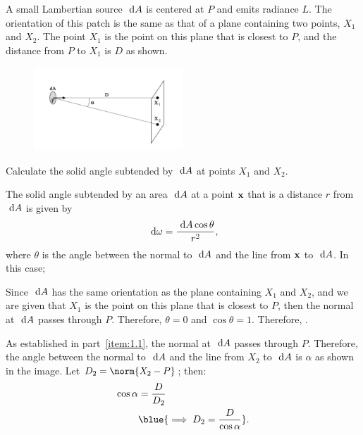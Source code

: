 \begin{problem}
  A small Lambertian source $\text{ d} A$ is centered at $P$
  and emits radiance $L$. The orientation of this patch is the same
  as that of a plane containing two points, $X_1$ and $X_2$.
  The point $X_1$ is the point on this plane that is closest to $P$,
  and the distance from $P$ to $X_1$ is $D$ as shown.
  \begin{figure}[H]
    \centering
    \includegraphics[width=0.5\textwidth]{figures/lambertian.png}
    \label{fig:1}
  \end{figure}
  \begin{enumroman}
    \newpage
    \item Calculate the solid angle subtended by $\text{ d} A$ at points $X_1$ and $X_2$.
      \begin{answer}
        The solid angle subtended by an area $\text{ d} A$ at a point $\mathbf{x}$ that is a distance
        $r$ from $\text{ d} A$ is given by
        \[ \text{ d}\omega = \frac{\text{ d} A \cos\theta}{r^2}, \]
        where $\theta$ is the angle between the normal to $\text{ d} A$
        and the line from $\mathbf{x}$ to $\text{ d} A$.
        In this case;
        \begin{enumarabic}
          \item Since $\text{ d} A$ has the same orientation as the plane containing $X_1$ and $X_2$,
            and we are given that $X_1$ is the point on this plane that is closest to $P$,
            then the normal at $\text{ d} A$ passes through $P$.
            Therefore, $\theta = 0$ and $\cos\theta = 1$.
            Therefore, .~\label{item:1.1}
          \item As established in part~\ref{item:1.1}, the normal at $\text{ d} A$ passes through $P$.
            Therefore, the angle between the normal to $\text{ d} A$ and the line from $X_2$ to $\text{ d} A$
            is $\alpha$ as shown in the image.
            Let $D_2 = \norm{X_2 - P}$; then:
            \begin{align*}
              \cos\alpha &= \frac{D}{D_2} \\
              &\blue{\implies D_2 = \frac{D}{\cos\alpha}}.
            \end{align*}

\end{enumarabic}
\end{answer}
\end{enumroman}
\end{problem}
